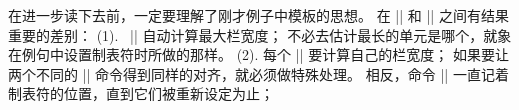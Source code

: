 \danger 在进一步读下去前，一定要理解了刚才例子中模板的思想。%
在 |\halign| 和 |\+| 之间有结果重要的差别：
(1). ~|\halign| 自动计算最大栏宽度；
不必去估计最长的单元是哪个，就象在例句中设置制表符时所做的那样。%
(2). 每个 |\halign| 要计算自己的栏宽度；
如果要让两个不同的 |\halign| 命令得到同样的对齐，就必须做特殊处理。%
相反，命令 |\+| 一直记着制表符的位置，直到它们被重新设定为止；
